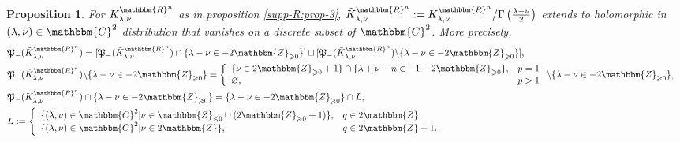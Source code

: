 \documentclass{article}
\newcommand{\assign}{:=}
\numberwithin{definition}{section}
\numberwithin{lemma}{section}
\newtheorem{proposition}{Proposition}
\numberwithin{proposition}{section}
{\theorembodyfont{\rmfamily}\newtheorem{remark}{Remark}
\numberwithin{remark}{section}
}
\begin{document}
\begin{proposition}
  \label{KR-normalization-even:prop-odd}For $K_{\lambda, \nu}^{\mathbbm{R}^n}$
  as in proposition \ref{supp-R:prop-3}, $\tilde{K}_{\lambda,
  \nu}^{\mathbbm{R}^n} \assign K_{\lambda, \nu}^{\mathbbm{R}^n} / \Gamma
  \left( \frac{\lambda - \nu}{2} \right)$ extends to holomorphic in $(
  \lambda, \nu) \in \mathbbm{C}^2$ distribution that vanishes on a discrete
  subset of $\mathbbm{C}^2$. More precisely,
  \begin{eqnarray}
    & \mathfrak{P}_- ( \tilde{K}_{\lambda, \nu}^{\mathbbm{R}^n}) = [
    \mathfrak{P}_- ( \tilde{K}_{\lambda, \nu}^{\mathbbm{R}^n}) \cap \{ \lambda
    - \nu \in - 2\mathbbm{Z}_{\geqslant 0} \}] \sqcup [ \mathfrak{P}_- (
    \tilde{K}_{\lambda, \nu}^{\mathbbm{R}^n}) \backslash \{ \lambda - \nu \in
    - 2\mathbbm{Z}_{\geqslant 0} \}], &  \nonumber\\
    & \mathfrak{P}_- ( \tilde{K}_{\lambda, \nu}^{\mathbbm{R}^n}) \backslash
    \{ \lambda - \nu \in - 2\mathbbm{Z}_{\geqslant 0} \} = \left\{
    \begin{array}{ll}
      \{ \nu \in 2\mathbbm{Z}_{\geqslant 0} + 1 \} \cap \{ \lambda + \nu - n
      \in - 1 - 2\mathbbm{Z}_{\geqslant 0} \}, & p = 1\\
      \varnothing, & p > 1
    \end{array} \right. \backslash \{ \lambda - \nu \in -
    2\mathbbm{Z}_{\geqslant 0} \}, &  \nonumber\\
    & \mathfrak{P}_- ( \tilde{K}_{\lambda, \nu}^{\mathbbm{R}^n}) \cap \{
    \lambda - \nu \in - 2\mathbbm{Z}_{\geqslant 0} \} = \{ \lambda - \nu \in -
    2\mathbbm{Z}_{\geqslant 0} \} \cap L, &  \nonumber\\
    & L \assign \left\{ \begin{array}{ll}
      \{ ( \lambda, \nu) \in \mathbbm{C}^2 | \nu\in\mathbbm{Z}_{\leqslant 0} \cup (
      2\mathbbm{Z}_{\geqslant 0} + 1) \}, & q \in 2\mathbbm{Z}\\
      \{ ( \lambda, \nu) \in \mathbbm{C}^2 | \nu \in 2\mathbbm{Z} \}, & q \in
      2\mathbbm{Z}+ 1.
    \end{array} \right. &  \nonumber
  \end{eqnarray}
\end{proposition}
\end{document}
